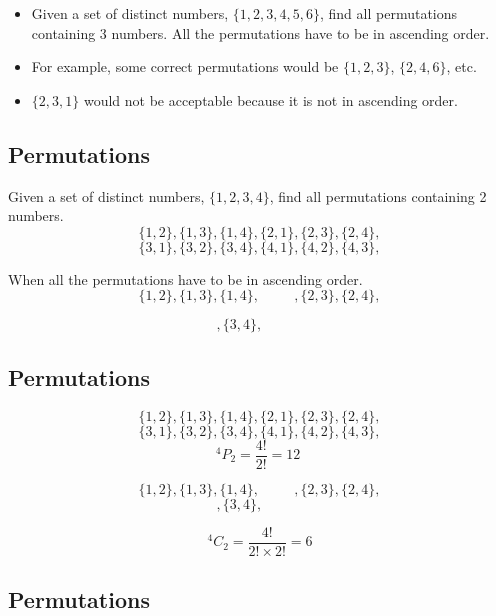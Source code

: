\documentclass[a4paper,12pt]{article}
\begin{document}
\begin{itemize}
\item Given a set of distinct numbers, $\{1, 2, 3, 4, 5, 6\}$, find all permutations containing 3 numbers. All the permutations have to be in ascending order.

\item For example, some correct permutations would be $\{1, 2, 3\}$, $\{2, 4, 6\}$, etc. 
\item $\{2, 3, 1\}$ would not be acceptable because it is not in ascending order.
\end{itemize}


\subsection{ Permutations}


Given a set of distinct numbers, $\{1, 2, 3, 4 \}$, find all permutations containing 2 numbers. 
 \[\{1,2\},\{1,3\},\{1,4\}, \{2,1\}, \{2,3\}, \{2,4\}, \]
 \[\{3,1\},\{3,2\},\{3,4\}, \{4,1\}, \{4,2\}, \{4,3\}, \]
\bigskip

When all the permutations have to be in ascending order.
 \[\{1,2\},\{1,3\},\{1,4\}, \phantom{\{2,1\}}, \{2,3\}, \{2,4\}, \]
 

 \[\phantom{\{3,1\},\{3,2\}},\{3,4\}, \phantom{\{4,1\}, \{4,2\}, \{4,3\}}\]



%

\subsection{ Permutations}
\[\{1,2\},\{1,3\},\{1,4\}, \{2,1\}, \{2,3\}, \{2,4\}, \]
\[\{3,1\},\{3,2\},\{3,4\}, \{4,1\}, \{4,2\}, \{4,3\}, \]
\[ ^4P_2 = \frac{4!}{2!} = 12 \; \]
\bigskip

\[\{1,2\},\{1,3\},\{1,4\}, \phantom{\{2,1\}}, \{2,3\}, \{2,4\}, \]
\[\phantom{\{3,1\},\{3,2\}},\{3,4\}, \phantom{\{4,1\}, \{4,2\}, \{4,3\}}\]

\[ ^4C_2 = \frac{4!}{2!\times 2!} = 6 \]





\subsection{ Permutations}
\end{document}
